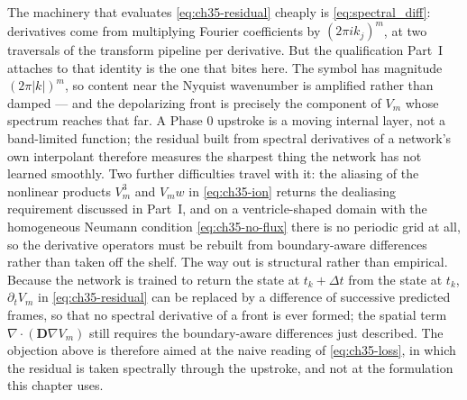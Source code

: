 The machinery that evaluates
\eqref{eq:ch35-residual} cheaply is \eqref{eq:spectral_diff}: derivatives come
from multiplying Fourier coefficients by $(2\pi i k_j)^m$, at two traversals of
the transform pipeline per derivative. But the qualification Part~I attaches to
that identity is the one that bites here. The symbol has magnitude
$(2\pi|k|)^m$, so content near the Nyquist wavenumber is amplified rather than
damped --- and the depolarizing front is precisely the component of $V_m$ whose
spectrum reaches that far. A Phase 0 upstroke is a moving internal layer, not a
band-limited function; the residual built from spectral derivatives of a
network's own interpolant therefore measures the sharpest thing the network has
not learned smoothly. Two further difficulties travel with it: the aliasing of
the nonlinear products $V_m^3$ and $V_m w$ in \eqref{eq:ch35-ion} returns the
dealiasing requirement discussed in Part~I, and on a ventricle-shaped domain
with the homogeneous Neumann condition \eqref{eq:ch35-no-flux} there is no
periodic grid at all, so the derivative operators must be rebuilt from
boundary-aware differences rather than taken off the shelf. The way out is
structural rather than empirical. Because the network is trained to return the
state at $t_k+\Delta t$ from the state at $t_k$, $\partial_t V_m$ in
\eqref{eq:ch35-residual} can be replaced by a difference of successive predicted
frames, so that no spectral derivative of a front is ever formed; the spatial
term $\nabla\cdot(\mathbf{D}\nabla V_m)$ still requires the boundary-aware
differences just described. The objection above is therefore aimed at the naive
reading of \eqref{eq:ch35-loss}, in which the residual is taken spectrally
through the upstroke, and not at the formulation this chapter uses.

